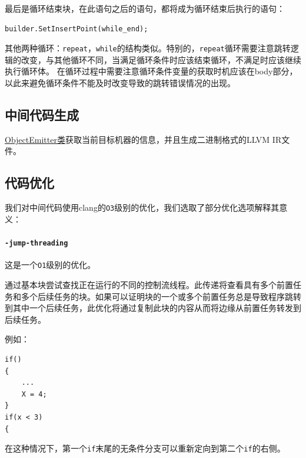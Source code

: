 \documentclass[lang=cn,11pt,a4paper,cite=authornum]{paper}
\begin{document}
最后是循环结束块，在此语句之后的语句，都将成为循环结束后执行的语句：

\begin{code}
\begin{verbatim}
builder.SetInsertPoint(while_end);
\end{verbatim}
\end{code}

其他两种循环：\texttt{repeat}，\texttt{while}的结构类似。特别的，\texttt{repeat}循环需要注意跳转逻辑的改变，与其他循环不同，当满足循环条件时应该结束循环，不满足时应该继续执行循环体。
在循环过程中需要注意循环条件变量的获取时机应该在body部分，以此来避免循环条件不能及时改变导致的跳转错误情况的出现。

\subsection{中间代码生成}

\href{run:./html/class_pascal_s_1_1_object_emitter.html}{ObjectEmitter类}获取当前目标机器的信息，并且生成二进制格式的LLVM IR文件。

\subsection{代码优化}

我们对中间代码使用clang的\texttt{O3}级别的优化，我们选取了部分优化选项解释其意义：

\paragraph{\texttt{-jump-threading}}

这是一个\texttt{O1}级别的优化。

通过基本块尝试查找正在运行的不同的控制流线程。此传递将查看具有多个前置任务和多个后续任务的块。如果可以证明块的一个或多个前置任务总是导致程序跳转到其中一个后续任务，此优化将通过复制此块的内容从而将边缘从前置任务转发到后续任务。

例如：

\begin{code}
\begin{verbatim}
if()
{
    ...
    X = 4;
}
if(x < 3)
{
\end{verbatim}
\end{code}

在这种情况下，第一个\texttt{if}末尾的无条件分支可以重新定向到第二个\texttt{if}的右侧。
\end{document}
